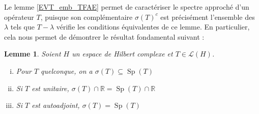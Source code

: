 \documentclass[a4paper,12pt]{article}
\newtheorem{lemma}[theorem]{Lemme}
\newcommand{\R}{\mathbb{R}}
\newcommand{\compl}{^c}
\DeclareMathOperator{\Sp}{Sp}
\begin{document}
Le lemme \ref{EVT_emb_TFAE} permet de caractériser le spectre approché d'un opérateur $T$,
puisque son complémentaire $\sigma(T)\compl$ est précisément l'ensemble des $\lambda$ tels que $T-\lambda$ vérifie les 
conditions équivalentes de ce lemme. En particulier, cela nous permet de démontrer le résultat fondamental suivant :

\begin{lemma}\label{approx_spectrum_facts}
    Soient $H$ un espace de Hilbert complexe et $T\in\mathcal{L}(H)$. 
    \begin{enumerate}[(i)]
        \item Pour $T$ quelconque, on a $\sigma(T)\subseteq\Sp(T)$ \label{approx_spectrum_facts/subset}
        \item Si $T$ est unitaire, $\sigma(T)\cap\R = \Sp(T)\cap\R$ \label{approx_spectrum_facts/eq_of_unitary}
        \item Si $T$ est autoadjoint, $\sigma(T) = \Sp(T)$ \label{approx_spectrum_facts/eq_of_hermitian}
    \end{enumerate}
\end{lemma}
\end{document}
